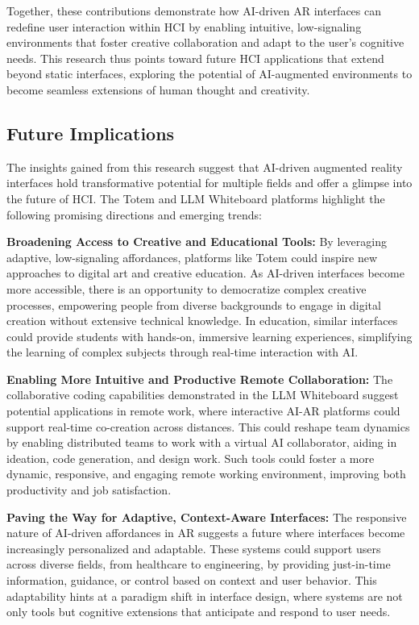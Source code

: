 Together, these contributions demonstrate how AI-driven AR interfaces can redefine user interaction within HCI by enabling intuitive, low-signaling environments that foster creative collaboration and adapt to the user’s cognitive needs.
This research thus points toward future HCI applications that extend beyond static interfaces, exploring the potential of AI-augmented environments to become seamless extensions of human thought and creativity.

\subsection{Future Implications}

The insights gained from this research suggest that AI-driven augmented reality interfaces hold transformative potential for multiple fields and offer a glimpse into the future of HCI.
The Totem and LLM Whiteboard platforms highlight the following promising directions and emerging trends:

\textbf{Broadening Access to Creative and Educational Tools:}
By leveraging adaptive, low-signaling affordances, platforms like Totem could inspire new approaches to digital art and creative education.
As AI-driven interfaces become more accessible, there is an opportunity to democratize complex creative processes, empowering people from diverse backgrounds to engage in digital creation without extensive technical knowledge.
In education, similar interfaces could provide students with hands-on, immersive learning experiences, simplifying the learning of complex subjects through real-time interaction with AI.

\textbf{Enabling More Intuitive and Productive Remote Collaboration:}
The collaborative coding capabilities demonstrated in the LLM Whiteboard suggest potential applications in remote work, where interactive AI-AR platforms could support real-time co-creation across distances.
This could reshape team dynamics by enabling distributed teams to work with a virtual AI collaborator, aiding in ideation, code generation, and design work.
Such tools could foster a more dynamic, responsive, and engaging remote working environment, improving both productivity and job satisfaction.

\textbf{Paving the Way for Adaptive, Context-Aware Interfaces:}
The responsive nature of AI-driven affordances in AR suggests a future where interfaces become increasingly personalized and adaptable.
These systems could support users across diverse fields, from healthcare to engineering, by providing just-in-time information, guidance, or control based on context and user behavior.
This adaptability hints at a paradigm shift in interface design, where systems are not only tools but cognitive extensions that anticipate and respond to user needs.

